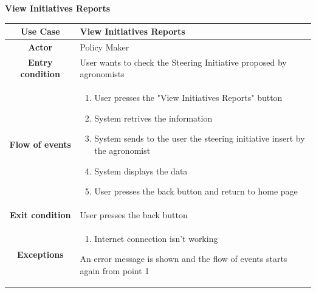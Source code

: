 \documentclass[table, 12pt]{article}
\begin{document}
\begin{itemize}
            \begin{table}[H]
                \item[] \textbf{View Initiatives Reports}
                \item[] 
                \centering
                \begin{tabular}{|c| m{}|}
                    \hline
                    \textbf{Use Case} & View Initiatives Reports\\ \hline
                    \textbf{Actor} & Policy Maker\\ \hline
                    \textbf{Entry condition} & User wants to check the Steering Initiative proposed by agronomists\\  \hline
                    \textbf{Flow of events} & \begin{enumerate}
                                                \item User presses the "View Initiatives Reports" button
                                                \item System retrives the information
                                                \item System sends to the user the steering initiative insert by the agronomist
                                                \item System displays the data
                                                \item User presses the back button and return to home page
                                            \end{enumerate}\\ \hline
                    \textbf{Exit condition} & User presses the back button \\ \hline
                    \textbf{Exceptions} &   \begin{enumerate}
                        \item Internet connection isn't working
                    \end{enumerate}
                    An error message is shown and the flow of events starts again from point 1\\ \hline                    
                \end{tabular}
            \end{table}
                

\end{itemize}
\end{document}
